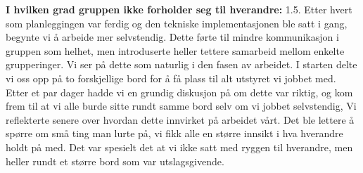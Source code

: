 \noindent \textbf{I hvilken grad gruppen ikke forholder seg til hverandre:} 1.5.
\newline
\noindent Etter hvert som planleggingen var ferdig og den tekniske implementasjonen ble satt i gang, begynte vi å arbeide mer selvstendig. 
Dette førte til mindre kommunikasjon i gruppen som helhet, men introduserte heller tettere samarbeid mellom enkelte grupperinger. Vi ser på dette som naturlig i den fasen av arbeidet.
I starten delte vi oss opp på to forskjellige bord for å få plass til alt utstyret vi jobbet med. Etter et par dager hadde vi en grundig diskusjon på om dette var riktig, og kom frem til at vi alle burde sitte rundt samme bord selv om vi jobbet selvstendig, 
Vi reflekterte senere over hvordan dette innvirket på arbeidet vårt. 
Det ble lettere å spørre om små ting man lurte på, vi fikk alle en større innsikt i hva hverandre holdt på med. 
Det var spesielt det at vi ikke satt med ryggen til hverandre, men heller rundt et større bord som var utslagsgivende. 
